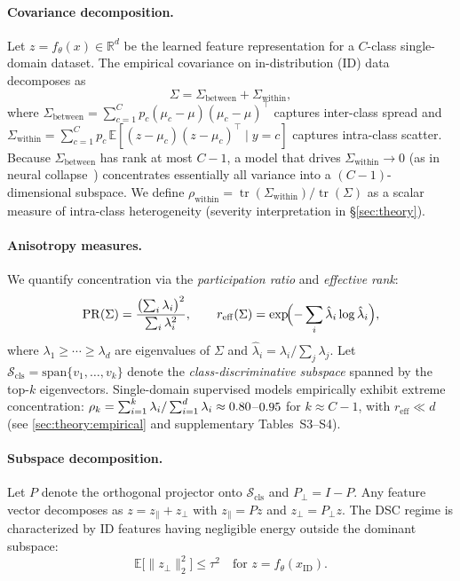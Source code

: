 \documentclass[runningheads]{llncs}
\begin{document}
\paragraph{Covariance decomposition.}
Let $z = f_\theta(x) \in \mathbb{R}^d$ be the learned feature representation for a $C$-class single-domain dataset.
The empirical covariance on in-distribution (ID) data decomposes as
\begin{equation}
  \Sigma = \Sigma_{\mathrm{between}} + \Sigma_{\mathrm{within}},
  \label{eq:cov-decomp}
\end{equation}
where $\Sigma_{\mathrm{between}} = \sum_{c=1}^C p_c (\mu_c - \mu)(\mu_c - \mu)^\top$ captures inter-class spread and $\Sigma_{\mathrm{within}} = \sum_{c=1}^C p_c\,\mathbb{E}[(z-\mu_c)(z-\mu_c)^\top \mid y{=}c]$ captures intra-class scatter.
Because $\Sigma_{\mathrm{between}}$ has rank at most $C{-}1$, a model that drives $\Sigma_{\mathrm{within}} \to 0$ (as in neural collapse~\cite{Papyan2020nc}) concentrates essentially all variance into a $(C{-}1)$-dimensional subspace.
We define $\rho_{\mathrm{within}} = \operatorname{tr}(\Sigma_{\mathrm{within}})/\operatorname{tr}(\Sigma)$ as a scalar measure of intra-class heterogeneity (severity interpretation in \S\ref{sec:theory}).

\paragraph{Anisotropy measures.}
We quantify concentration via the \emph{participation ratio} and \emph{effective rank}:
\begin{equation}
  \mathrm{PR}(\Sigma) = \frac{\bigl(\sum_i \lambda_i\bigr)^2}{\sum_i \lambda_i^2}, \qquad
  r_{\mathrm{eff}}(\Sigma) = \exp\!\Bigl(-\sum_i \hat{\lambda}_i \log \hat{\lambda}_i\Bigr),
  \label{eq:pr-reff}
\end{equation}
where $\lambda_1 \ge \cdots \ge \lambda_d$ are eigenvalues of $\Sigma$ and $\hat{\lambda}_i = \lambda_i / \sum_j \lambda_j$.
Let $\mathcal{S}_{\mathrm{cls}} = \mathrm{span}\{v_1,\ldots,v_k\}$ denote the \emph{class-discriminative subspace} spanned by the top-$k$ eigenvectors.
Single-domain supervised models empirically exhibit extreme concentration: $\rho_k = \sum_{i=1}^{k}\lambda_i / \sum_{i=1}^{d}\lambda_i \approx 0.80$--$0.95$ for $k \approx C{-}1$, with $r_{\mathrm{eff}} \ll d$ (see \cref{sec:theory:empirical} and supplementary Tables~S3--S4).

\paragraph{Subspace decomposition.}
Let $P$ denote the orthogonal projector onto $\mathcal{S}_{\mathrm{cls}}$ and $P_\perp = I - P$.
Any feature vector decomposes as $z = z_\parallel + z_\perp$ with $z_\parallel = Pz$ and $z_\perp = P_\perp z$.
The DSC regime is characterized by ID features having negligible energy outside the dominant subspace:
\begin{equation}
  \mathbb{E}\bigl[\|z_\perp\|_2^2\bigr] \le \tau^2 \quad \text{for } z = f_\theta(x_{\mathrm{ID}}).
  \label{eq:A1}
\end{equation}
\end{document}
